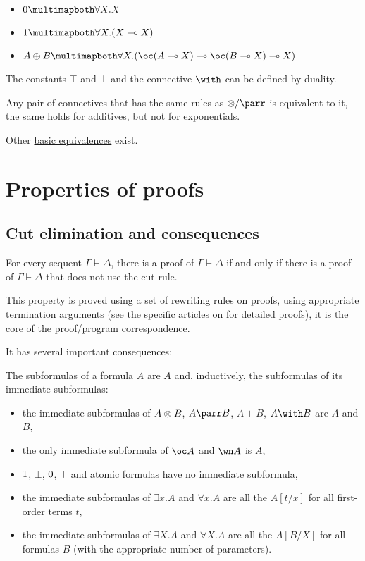 \begin{itemize}
\item \(\zero \linequiv \forall X.X\)
\item \(\one \linequiv \forall X.(X \limp X)\)
\item \(A \plus B \linequiv \forall X.(\oc(A \limp X) \limp \oc(B \limp X) \limp X)\)
\end{itemize}

The constants \(\top\) and \(\bot\) and the connective \(\with\) can be
defined by duality.

Any pair of connectives that has the same rules as \(\tens/\parr\) is
equivalent to it, the same holds for additives, but not for
exponentials.

Other \hyperref[list-of-equivalences]{basic equivalences} exist.

\section{Properties of proofs}\label{properties-of-proofs}

\subsection{Cut elimination and consequences}\label{cut-elimination-and-consequences}

\begin{theorem}
For every sequent $\Gamma\vdash\Delta$, there is a proof of
$\Gamma\vdash\Delta$ if and only if there is a proof of
$\Gamma\vdash\Delta$ that does not use the cut rule.
\end{theorem}

This property is proved using a set of rewriting rules on proofs, using
appropriate termination arguments (see the specific articles on
 for detailed proofs), it is the
core of the proof/program correspondence.

It has several important consequences:

\begin{definition}[subformula]
The subformulas of a formula $A$ are $A$ and, inductively, the subformulas of its immediate subformulas:
\begin{itemize}
\item the immediate subformulas of $A\otimes B$, $A\parr B$, $A\plus B$, $A\with B$ are $A$ and $B$,
\item the only immediate subformula of $\oc A$ and $\wn A$ is $A$,
\item $1$, $\bot$, $0$, $\top$ and atomic formulas have no immediate subformula,
\item the immediate subformulas of $\exists x.A$ and $\forall x.A$ are all the $A[t/x]$ for all first-order terms $t$,
\item the immediate subformulas of $\exists X.A$ and $\forall X.A$ are all the $A[B/X]$ for all formulas $B$ (with the appropriate number of parameters).
\end{itemize}
\end{definition}


